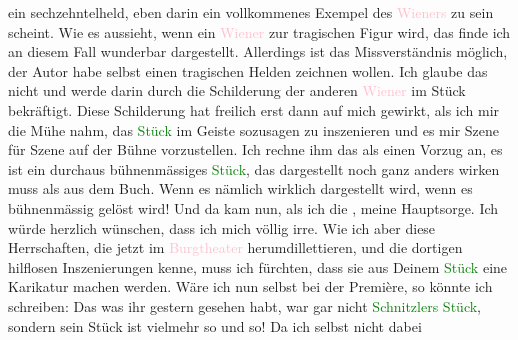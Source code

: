                ein sechzehntelheld, eben darin ein vollkommenes Exempel des \textcolor{pink}{Wieners}{}\ledrightnote{\textcolor{pink}{Wien}} zu sein scheint. Wie es aussieht, wenn ein \textcolor{pink}{Wiener}{}\ledrightnote{\textcolor{pink}{Wien}} zur tragischen Figur wird, das finde ich an
               diesem Fall wunderbar dargestellt. Allerdings ist das Missverständnis möglich, der
               Autor habe selbst einen tragischen Helden zeichnen wollen. Ich glaube das nicht und
               werde darin durch die Schilderung der anderen \textcolor{pink}{Wiener}{}\ledrightnote{\textcolor{pink}{Wien}}
               im Stück bekräftigt. Diese Schilderung hat freilich erst dann auf mich gewirkt, als
               ich mir die Mühe nahm, {\pb}das \textcolor{green}{Stück}{} im Geiste sozusagen zu inszenieren und
               es mir Szene für Szene auf der Bühne vorzustellen. Ich rechne ihm das als einen
               Vorzug an, es ist ein durchaus bühnenmässiges \textcolor{green}{Stück}{}, das dargestellt noch ganz anders wirken muss als aus
               dem Buch. Wenn es nämlich wirklich dargestellt wird, wenn es bühnenmässig gelöst
               wird! Und da kam nun, als ich die \label{K_L01980_1v}\label{K_L01980_1h}, meine
               Hauptsorge. Ich würde herzlich wünschen, dass ich mich völlig irre. Wie ich aber
               diese Herrschaften, die jetzt im \textcolor{pink}{Burgtheater}{}\ledrightnote{\textcolor{pink}{Burgtheater}}
               herumdillettieren, und die dortigen hilflosen Inszenierungen kenne, muss ich
               fürchten, dass sie aus Deinem \textcolor{green}{Stück}{} eine Karikatur machen {\pb}werden. Wäre
               ich nun selbst bei der Première, so könnte ich schreiben: Das was ihr gestern gesehen
               habt, war gar nicht \textcolor{green}{Schnitzlers
                  Stück}{}, sondern sein Stück ist vielmehr so und so! Da ich selbst nicht dabei
